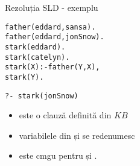 \documentclass[xcolor=pdftex,romanian,colorlinks]{beamer}
\begin{document}
\begin{frame}{Rezoluția SLD - exemplu}

{
\footnotesize
\vspace{.2cm}
\begin{minipage}{7cm}
\begin{alltt}
father(eddard,sansa). \\
father(eddard,jonSnow). \\

stark(eddard). \\
stark(catelyn). \\

stark(X) :- father(Y,X),    
    stark(Y).
\end{alltt}
\end{minipage}
\begin{minipage}{3.5cm}
\texttt{?- stark(jonSnow)}
\end{minipage}

\vspace{.2cm}
\begin{center}
\end{center}
\vspace{-.3cm}
\begin{itemize}
	\item {} este o clauză definită din $KB$
	\item variabilele din  și  se redenumesc
	\item \intens{ $\theta$} este cmgu pentru  și .
\end{itemize}
}
\end{frame}
\end{document}
